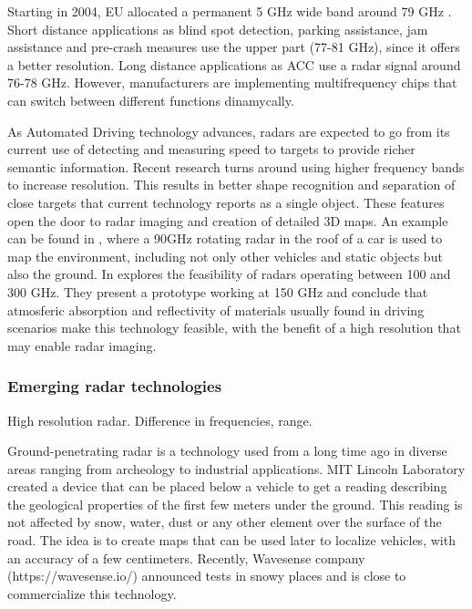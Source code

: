 Starting in 2004, EU allocated a permanent 5 GHz wide band around 79 GHz 
\cite{EULawandPublications2004}. 
Short distance applications as blind spot detection, parking assistance, jam 
assistance and pre-crash measures use the upper part (77-81 GHz), since it 
offers a better resolution. Long distance applications as ACC use a radar 
signal around 76-78 GHz. However, manufacturers are implementing multifrequency 
chips that can switch between different functions dinamycally.

As Automated Driving technology advances, radars are expected to go from its
current use of detecting and measuring speed to targets to provide richer
semantic information. 
Recent research turns around using higher frequency bands to increase
resolution. This results in better shape recognition and separation of close
targets that current technology reports as a single object.
These features open the door to radar imaging and creation of detailed 3D maps. 
An example can be found in \cite{Reina2015}, where a 90GHz rotating radar in
the roof of a car is used to map the environment, including not only other
vehicles and static objects but also the ground.
In \cite{Kohler2013} explores the feasibility of radars operating between 
100 and 300 GHz. They present a prototype working at 150 GHz and conclude 
that atmosferic absorption and reflectivity of materials usually found in 
driving scenarios make this technology feasible, with the benefit of a high
resolution that may enable radar imaging.


\subsubsection{Emerging radar technologies}

High resolution radar. Difference in frequencies, range.

Ground-penetrating radar is a technology used from a long
time ago in diverse areas ranging from archeology to industrial applications.
MIT Lincoln Laboratory created a device \cite{Cornick2016} that can be placed 
below a vehicle to get a reading describing the geological properties of the
first few meters under the ground. This reading is not affected by snow, 
water, dust or any other element over the surface of the road. The idea is to
create maps that can be used later to localize vehicles, with an accuracy of
a few centimeters. \cite{XXXX}
Recently, Wavesense company (https://wavesense.io/) announced tests in snowy
places and is close to commercialize this technology.



